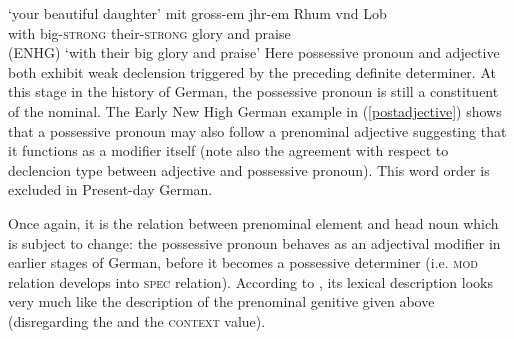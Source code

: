 \documentclass[output=paper
                ,modfonts
                ,nonflat
	        ,collection
	        ,collectionchapter
	        ,collectiontoclongg
 	        ,biblatex
                ,babelshorthands
                ,newtxmath
                ,draftmode
                ,colorlinks, citecolor=brown
]{./langsci/langscibook}
\begin{document}
\glt `your beautiful daughter'
\ex \label{postadjective}
\gll mit gross-em jhr-em Rhum vnd Lob \\ with big-\textsc{strong} their-\textsc{strong} glory and praise   \\ \hfill (ENHG)
\glt `with their big glory and praise'
\zl
Here possessive pronoun and adjective both exhibit weak declension triggered by the preceding definite determiner. At this stage in the history of German, the possessive pronoun is still a constituent of the nominal. The Early New High German example in (\ref{postadjective}) shows that a possessive pronoun may also follow a prenominal adjective suggesting that it functions as a modifier itself (note also the agreement with respect to declencion type between adjective and possessive pronoun). This word order is excluded in Present-day German.

Once again, it is the relation between prenominal element and head noun which is subject to change: the possessive pronoun behaves as an adjectival modifier in earlier stages of German, before it becomes a possessive determiner (i.e. \textsc{mod} relation develops into \textsc{spec} relation). According to \cite[54]{PoSa94}, its lexical description looks very much like the description of the prenominal genitive given above (disregarding the \content and the \textsc{context} value).
\end{document}

